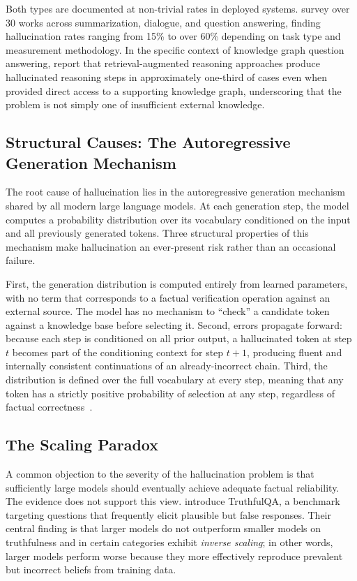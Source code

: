 Both types are documented at non-trivial rates in deployed systems. \citet{ji2023survey} survey over 30 works across summarization, dialogue, and question answering, finding hallucination rates ranging from 15\% to over 60\% depending on task type and measurement methodology. In the specific context of knowledge graph question answering, \citet{luo2024gcr} report that retrieval-augmented reasoning approaches produce hallucinated reasoning steps in approximately one-third of cases even when provided direct access to a supporting knowledge graph, underscoring that the problem is not simply one of insufficient external knowledge.

\subsection{Structural Causes: The Autoregressive Generation Mechanism}

The root cause of hallucination lies in the autoregressive generation mechanism shared by all modern large language models. At each generation step, the model computes a probability distribution over its vocabulary conditioned on the input and all previously generated tokens. Three structural properties of this mechanism make hallucination an ever-present risk rather than an occasional failure.

First, the generation distribution is computed entirely from learned parameters, with no term that corresponds to a factual verification operation against an external source. The model has no mechanism to ``check'' a candidate token against a knowledge base before selecting it. Second, errors propagate forward: because each step is conditioned on all prior output, a hallucinated token at step $t$ becomes part of the conditioning context for step $t{+}1$, producing fluent and internally consistent continuations of an already-incorrect chain. Third, the distribution is defined over the full vocabulary at every step, meaning that any token has a strictly positive probability of selection at any step, regardless of factual correctness~\citep{brown2020gpt3,huang2023hallucination,ji2023survey}.

\subsection{The Scaling Paradox}

A common objection to the severity of the hallucination problem is that sufficiently large models should eventually achieve adequate factual reliability. The evidence does not support this view. \citet{lin2022truthfulqa} introduce TruthfulQA, a benchmark targeting questions that frequently elicit plausible but false responses. Their central finding is that larger models do not outperform smaller models on truthfulness and in certain categories exhibit \textit{inverse scaling}; in other words, larger models perform worse because they more effectively reproduce prevalent but incorrect beliefs from training data.

